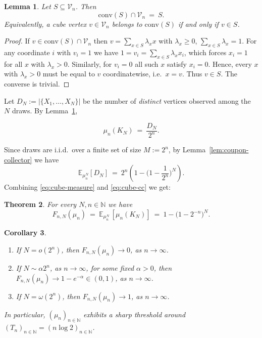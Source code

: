 \documentclass[11pt,a4paper]{article} %
\newtheorem{theorem}{Theorem}[section]
\newtheorem{lemma}[theorem]{Lemma}
\newtheorem{corollary}[theorem]{Corollary}
\theoremstyle{definition}
\theoremstyle{remark}
\newcommand{\E}{\mathbb{E}}
\newcommand{\conv}{\mathrm{conv}}
\newcommand{\1}{\mathds{1}}
\begin{document}
\begin{lemma}\label{lem:no-new-verts}
Let $S\subseteq\mathcal{V}_n$. Then
\[
\conv(S)\cap \mathcal{V}_n\ =\ S.
\]
Equivalently, a cube vertex $v\in\mathcal{V}_n$ belongs to $\conv(S)$ \emph{if and only if} $v\in S$.
\end{lemma}

\begin{proof}
If $v\in \conv(S) \cap \mathcal{V}_n$ then $v=\sum_{x\in S}\lambda_x x$ with $\lambda_x\ge 0$, $\sum_{x \in S}\lambda_x=1$.
For any coordinate $i$ with $v_i=1$ we have $1=v_i=\sum_{x\in S}\lambda_x x_i$, which forces $x_i=1$ for all $x$ with $\lambda_x>0$.
Similarly, for $v_i=0$ all such $x$ satisfy $x_i=0$. Hence, every $x$ with $\lambda_x>0$ must be equal to $v$ coordinatewise, i.e.\ $x=v$.
Thus $v\in S$. The converse is trivial.
\end{proof}


Let $D_N:=|\{X_1,\dots,X_N\}|$ be the number of \emph{distinct} vertices observed among the $N$ draws.
By Lemma~\ref{lem:no-new-verts},

\begin{equation}\label{eq:cube-measure}
    \mu_n(K_N)\ =\ \frac{D_N}{2^n}.
\end{equation}


Since draws are i.i.d.\ over a finite set of size $M:=2^n$, by Lemma~\ref{lem:coupon-collector} we have
\begin{equation}\label{eq:cube-cc}
\E_{\mu_n^N} [D_N]\ =\ 2^n\left(1-\Big(1-\frac{1}{2^n}\Big)^N\right).
\end{equation}
Combining \eqref{eq:cube-measure} and \eqref{eq:cube-cc} we get:

\begin{theorem}\label{thm:cube-exact}
For every $N,n \in \mathbb{N}$ we have
\begin{equation}\label{eq:cube-exact}
F_{n,N}(\mu_n)\ =\ \E_{\mu_n^N}\,[\mu_n(K_N)]
\ =\ 1-\Big(1-2^{-n}\Big)^{N}.
\end{equation}
\end{theorem}

\begin{corollary}\label{cor:cube-regimes}
\leavevmode
\begin{enumerate}


\item[{\rm (i)}] If $N=o(2^n)$, then $F_{n,N}(\mu_n)\to 0$, as $n \to \infty$.
\item[{\rm (ii)}] If $N\sim \alpha  2^n$, as $n \to \infty$, for some fixed $\alpha>0$, then $F_{n,N}(\mu_n)\to 1-e^{-\alpha}\in(0,1)$, as $n \to \infty$.
\item[{\rm (iii)}] If $N=\omega(2^n)$, then $F_{n,N}(\mu_n)\to 1$, as $n \to \infty$.

\end{enumerate}
In particular, $(\mu_n)_{n \in \mathbb{N}}$ exhibits a sharp threshold around $(T_n)_{n \in \mathbb{N}}=(n\log2)_{n \in \mathbb{N}} $.
\end{corollary}
\end{document}
